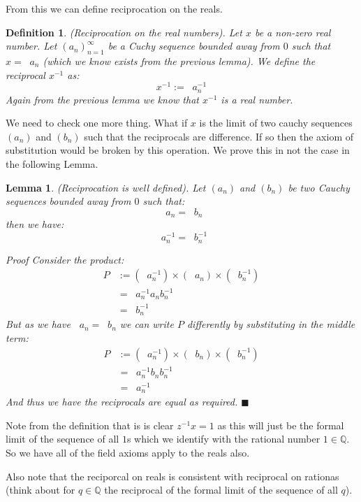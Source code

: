 \documentclass{article}
\newtheorem{definition}{Definition}[subsection]
\newtheorem{lemma}{Lemma}[subsection]
\newcommand{\Q}{\mathbb{Q}}
\DeclareMathOperator{\infLIM}{\mathrm{LIM}_{n \to \infty}}
\let\it\textit
\begin{document}
From this we can define reciprocation on the reals.

\begin{definition}
	(Reciprocation on the real numbers). Let $x$ be a 
	non-zero real number. Let $(a_n)^{\infty}_{n=1}$ be 
	a Cuchy sequence bounded away from $0$ such 
	that $x = \infLIM a_n$ (which we know exists from
	the previous lemma). We define the reciprocal 
	$x^{-1}$ as: 
	$$
	x^{-1} := \infLIM a_n^{-1}	
	$$
	Again from the previous lemma we know that 
	$x^{-1}$ is a real number.
\end{definition}

We need to check one more thing. What if $x$ is the limit 
of two cauchy sequences $(a_n)$ and $(b_n)$ such that 
the reciprocals are difference. If so then 
the axiom of substitution would be broken by this operation. 
We prove this in not the case in the following Lemma.

\begin{lemma}
	 (Reciprocation is well defined). Let $(a_n)$ and 
	 $(b_n)$ be two Cauchy sequences bounded 
	 away from $0$ such that:
	 $$
	 \infLIM a_n = \infLIM b_n
	 $$
	 then we have: 
	 $$
	 \infLIM a_n^{-1} = \infLIM b_n^{-1}
	 $$

	 \it{Proof} Consider the product: 
	 \begin{align*}
		 P &:=(\infLIM a_n^{-1}) \times  
		 (\infLIM a_n) \times (\infLIM b_n^{-1})  \\ 
		   &= \infLIM a_n^{-1}a_n b_n^{-1} \\ 
		   &= \infLIM b_n^{-1}
	 \end{align*}
	 But as we have $\infLIM a_n = \infLIM b_n$ we 
	 can write $P$ differently by substituting in the middle 
	 term:
	 \begin{align*}
		 P &:=(\infLIM a_n^{-1}) \times  
		 (\infLIM b_n) \times (\infLIM b_n^{-1})  \\ 
		   &= \infLIM a_n^{-1}b_n b_n^{-1} \\ 
		   &= \infLIM a_n^{-1}
	 \end{align*}
	 And thus we have the reciprocals are equal as required.
	 \hfill $\blacksquare$
\end{lemma}
Note from the definition that is is clear $z^{-1}x = 1$ as this 
will just be the formal limit of the sequence of all $1$s which 
we identify with the rational number $1 \in \Q$. So 
we have all of the field axioms apply to the reals also. 

Also note that the reciporcal on reals is consistent 
with reciprocal on rationas (think about for $q\in\Q$ the reciprocal 
of the formal limit of the sequence of all $q$).
\end{document}
